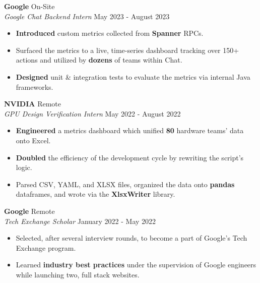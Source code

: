 \documentclass[a4paper]{article}
\begin{document}
\textbf{Google} \hfill On-Site\\
\textit{Google Chat Backend Intern} \hfill May 2023 - August 2023\\
\vspace{-2mm}
\begin{itemize} \itemsep -1pt
	\item \textbf{Introduced} custom metrics collected from \textbf{Spanner} RPCs.
	\item Surfaced the metrics to a live, time-series dashboard tracking over 150+ actions and utilized by \textbf{dozens} of teams within Chat.
	\item \textbf{Designed} unit \& integration tests to evaluate the metrics via internal Java frameworks.
\end{itemize}
\vspace{-2mm}

\textbf{NVIDIA} \hfill Remote\\
\textit{GPU Design Verification Intern} \hfill May 2022 - August 2022\\
\vspace{-2mm}
\begin{itemize} \itemsep -1pt
	\item \textbf{Engineered} a metrics dashboard which unified \textbf{80} hardware teams' data onto Excel.
	\item \textbf{Doubled} the efficiency of the development cycle by rewriting the script's logic. 
	\item Parsed CSV, YAML, and XLSX files, organized the data onto \textbf{pandas} dataframes, and wrote via the \textbf{XlsxWriter} library. 
\end{itemize}
\vspace{-2mm}

\textbf{Google} \hfill Remote\\
\textit{Tech Exchange Scholar} \hfill January 2022 - May 2022\\
\vspace{-2mm}
\begin{itemize} \itemsep -1pt
	\item Selected, after several interview rounds, to become a part of Google's Tech Exchange program. 
	\item Learned \textbf{industry best practices} under the supervision of Google engineers while launching two, full stack websites.
\end{itemize}
\vspace{-2mm}
\end{document}
